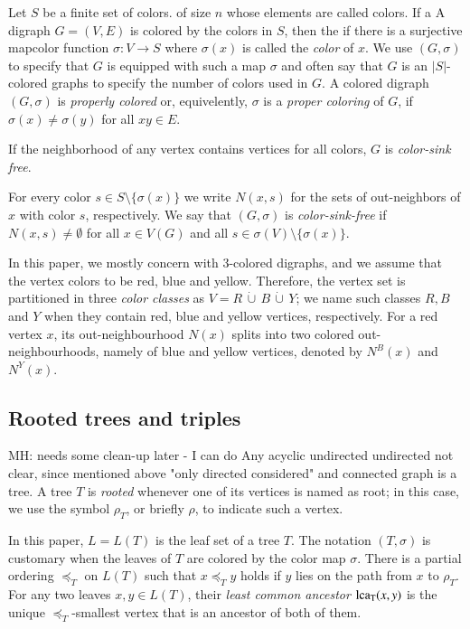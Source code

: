 \documentclass[final,3p,times]{elsarticle}
\newcommand{\TODO}[1]{\begingroup\color{red}#1\endgroup}
\newcommand{\OLD}[1]{\begingroup\tiny\color{gray}#1\endgroup}
\newcommand{\mh}[1]{\begingroup\color{blue}#1\endgroup}
\begin{document}
Let $S$ be a finite set \mh{of colors}. \OLD{of size $n$ whose elements are called colors.} \OLD{If a}
\mh{A} digraph $G=(V,E)$ is colored by the colors in $S$, \OLD{then the} 
\mh{if there is a} surjective \mh{map}\OLD{color
function} $\sigma: V\to S$ \mh{where 
$\sigma(x)$ is called the \emph{color} of $x$. We use $(G,\sigma)$ to specify
that $G$ is equipped with such a map $\sigma$ and often say that $G$ 
is an $|S|$-colored graphs to specify the number of colors used in $G$. 
A colored digraph $(G, \sigma)$ 
is \emph{properly colored} or, equivelently, $\sigma$ is a \emph{proper coloring}
of $G$, if $\sigma(x)\neq \sigma(y)$ for all $xy\in E$. }


\OLD{If the neighborhood of any vertex contains
vertices for all colors, $G$ is \emph{color-sink free}. 
}

\mh{For every color $s\in S\setminus \{\sigma(x)\}$
we write $N(x,s)$ for the  sets of out-neighbors 
of $x$ with color $s$, respectively.  We say that
$(G,\sigma)$ is \emph{color-sink-free} if $N(x,s)\ne\emptyset$ for all
$x\in V(G)$ and all $s\in \sigma(V)\setminus\{\sigma(x)\}$.
}


In this paper, we mostly concern with 3-colored digraphs, and we assume that the vertex colors to be red, blue and yellow. Therefore, the vertex set is partitioned in three \emph{color classes} as $V=R\,\dot{\cup}\, B\,\dot{\cup}\, Y$; we name such classes $R,B$ and $Y$ when they contain red, blue and yellow vertices, respectively. For a red vertex $x$, its out-neighbourhood $N(x)$ splits into two colored out-neighbourhoods, namely of blue and yellow vertices, denoted by $N^{B}(x)$ and $N^{Y}(x)$. 

\subsection{Rooted trees and triples} \TODO{MH: needs some clean-up later - I can do}
Any acyclic undirected \TODO{undirected not clear, since mentioned above "only directed considered"} and connected graph is a tree. A tree $T$ is
\emph{rooted} whenever one of its vertices is named as root; in this case, we
use the symbol $\rho_T$, or briefly $\rho$, to indicate such a vertex.  

In this paper, $L=L(T)$ is the leaf set of a tree $T$. The notation $(T,\sigma)$ is customary when the leaves of $T$ are colored by the color map $\sigma$. There is a partial ordering $\preceq_T$ on $L(T)$ such that $x\preceq_T y$ holds if $y$ lies on the path from $x$ to $\rho_T$. For any two leaves $x,y\in L(T)$, their \emph{least common ancestor} ${\rm{lca_T}}(x,y)$ is the unique $\preceq_T$-smallest vertex that is an ancestor of both of them.
\end{document}
